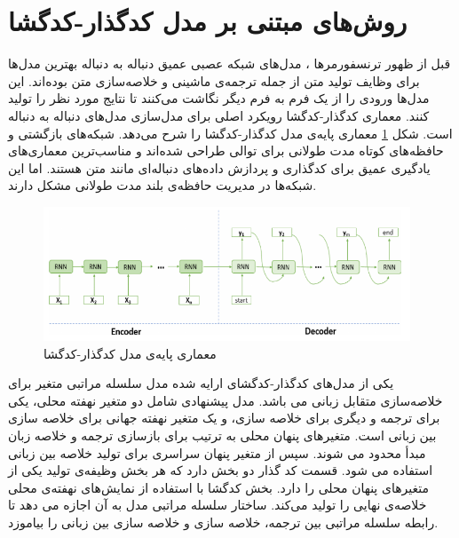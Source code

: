 \section{روش‌های مبتنی بر مدل کدگذار-کدگشا}
قبل از ظهور ترنسفورمرها ، مدل‌های شبکه عصبی عمیق دنباله به دنباله بهترین مدل‌ها برای وظایف تولید متن از جمله ترجمه‌ی ماشینی و خلاصه‌سازی متن بوده‌اند. این مدل‌ها ورودی را از یک فرم به فرم دیگر نگاشت می‌کنند تا نتایج مورد نظر را تولید کنند. معماری کدگذار-کدگشا رویکرد اصلی برای مدل‌سازی مدل‌های دنباله به دنباله است. شکل \ref{fig:encoder_decoder} معماری پایه‌‌ی مدل  کدگذار-کدگشا را شرح می‌دهد.
شبکه‌های بازگشتی
\cite{elman1990finding}
و حافظه‌های کوتاه مدت طولانی
\cite{hochreiter1997long}
برای توالی طراحی شده‌اند و مناسب‌ترین معماری‌های یادگیری عمیق برای کدگذاری و پردازش داده‌های دنباله‌ای مانند متن هستند. اما این شبکه‌ها در مدیریت حافظه‌ی بلند مدت طولانی
مشکل دارند.
\begin{figure}[!h]
	\begin{center}
		\includegraphics[height=4cm]{encoder_decoder.png}
	\end{center}
	\caption{معماری پایه‌‌ی مدل  کدگذار-کدگشا\cite{ALOMARI2022101276}}
	\label{fig:encoder_decoder}
	\medskip
	\small
\end{figure}

یکی از مدل‌های کدگذار-کدگشای ارایه شده مدل سلسله مراتبی متغیر برای خلاصه‌سازی متقابل زبانی
می باشد.  مدل پیشنهادی شامل دو متغیر نهفته محلی، یکی برای ترجمه و دیگری برای خلاصه سازی، و یک متغیر نهفته جهانی برای خلاصه سازی بین زبانی است. متغیرهای پنهان محلی به ترتیب برای بازسازی ترجمه و خلاصه زبان مبدأ محدود می شوند. سپس از متغیر پنهان سراسری برای تولید خلاصه بین زبانی استفاده می شود. قسمت کد گذار دو بخش دارد که هر بخش وظیفه‌ی تولید یکی از متغیرهای پنهان محلی را دارد.
بخش کدگشا با استفاده از نمایش‌های نهفته‌ی محلی خلاصه‌ی نهایی را تولید می‌کند.
ساختار سلسله مراتبی مدل به آن اجازه می دهد تا رابطه سلسله مراتبی بین ترجمه، خلاصه سازی و خلاصه سازی بین زبانی را بیاموزد.






